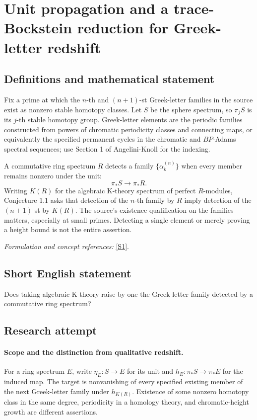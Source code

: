 \documentclass[11pt]{article}
\begin{document}
\section*{\texorpdfstring{Unit propagation and a trace-Bockstein reduction for Greek-letter redshift}{Unit propagation and a trace-Bockstein reduction for Greek-letter redshift}}\label{20000025}
\subsection{Definitions and mathematical statement}
Fix a prime at which the $n$-th and $(n+1)$-st Greek-letter families in the source exist as nonzero stable homotopy classes. Let $S$ be the sphere spectrum, so $\pi_jS$ is its $j$-th stable homotopy group. Greek-letter elements are the periodic families constructed from powers of chromatic periodicity classes and connecting maps, or equivalently the specified permanent cycles in the chromatic and $BP$-Adams spectral sequences; use Section 1 of Angelini-Knoll for the indexing.

A commutative ring spectrum $R$ detects a family $\{\alpha_k^{(n)}\}$ when every member remains nonzero under the unit:
\[
 \pi_*S\longrightarrow\pi_*R.
\]
Writing $K(R)$ for the algebraic K-theory spectrum of perfect $R$-modules, Conjecture 1.1 asks that detection of the $n$-th family by $R$ imply detection of the $(n+1)$-st by $K(R)$. The source's existence qualification on the families matters, especially at small primes. Detecting a single element or merely proving a height bound is not the entire assertion.
\par\smallskip\textit{Formulation and concept references:} \href{https://arxiv.org/abs/1810.10088}{[S1]}.

\subsection{Short English statement}
Does taking algebraic K-theory raise by one the Greek-letter family detected by a commutative ring spectrum?
\subsection{Research attempt}

\paragraph{Scope and the distinction from qualitative redshift.}
For a ring spectrum $E$, write $\eta_E:S\to E$ for its unit and
$h_E:\pi_*S\to\pi_*E$ for the induced map. The target is nonvanishing
of every specified existing member of the next Greek-letter family
under $h_{K(R)}$. Existence of some nonzero homotopy class in the same
degree, periodicity in a homology theory, and chromatic-height growth
are different assertions.
\end{document}
